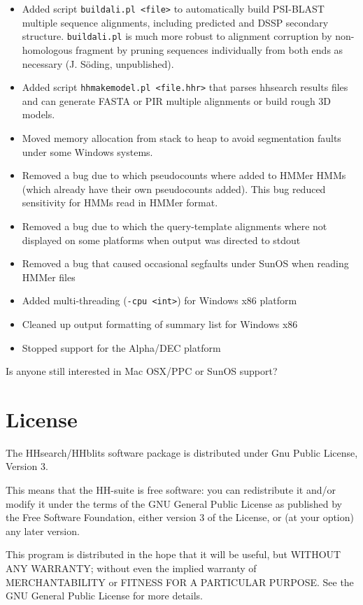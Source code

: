 \documentclass[11pt,a4paper]{article}
\begin{document}
\begin{itemize}
\item{Added script \verb`buildali.pl <file>` to automatically build PSI-BLAST multiple 
  sequence alignments, including predicted and DSSP secondary structure. 
  \verb`buildali.pl` is much more robust to alignment corruption by non-homologous fragment by
  pruning sequences individually from both ends as necessary (J. S\"oding, unpublished).
}
\item{Added script \verb`hhmakemodel.pl <file.hhr>` that parses hhsearch results files 
  and can generate FASTA or PIR multiple alignments or build rough 3D models.
}
\item{Moved memory allocation from stack to heap to avoid segmentation faults
  under some Windows systems.
}
\item{Removed a bug due to which pseudocounts where added to HMMer HMMs (which 
  already have their own pseudocounts added). This bug reduced sensitivity 
  for HMMs read in HMMer format.
}
\item{Removed a bug due to which the query-template alignments where not displayed
  on some platforms when output was directed to stdout
}
\item{Removed a bug that caused occasional segfaults under SunOS when reading HMMer files
}
\item{Added multi-threading (\verb`-cpu <int>`) for Windows x86 platform
}
\item{Cleaned up output formatting of summary list for Windows x86
}
\item{Stopped support for the Alpha/DEC platform
}
\end{itemize}

Is anyone still interested in Mac OSX/PPC or SunOS support? 


\section{License}

The HHsearch/HHblits software package is distributed under Gnu Public License, Version 3. 

This means that the HH-suite is free software: you can redistribute it and/or modify
it under the terms of the GNU General Public License as published by
the Free Software Foundation, either version 3 of the License, or
(at your option) any later version.

This program is distributed in the hope that it will be useful,
but WITHOUT ANY WARRANTY; without even the implied warranty of
MERCHANTABILITY or FITNESS FOR A PARTICULAR PURPOSE.  See the
GNU General Public License for more details.
\end{document}

